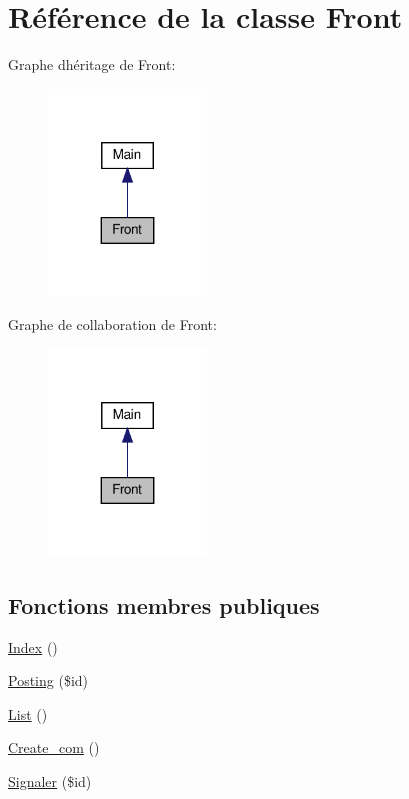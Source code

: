 \hypertarget{class_src_1_1_controllers_1_1_front}{}\section{Référence de la classe Front}
\label{class_src_1_1_controllers_1_1_front}


Graphe d\textquotesingle{}héritage de Front\+:\nopagebreak
\begin{figure}[H]
\begin{center}
\leavevmode
\includegraphics[width=119pt]{d6/db7/class_src_1_1_controllers_1_1_front__inherit__graph}
\end{center}
\end{figure}


Graphe de collaboration de Front\+:\nopagebreak
\begin{figure}[H]
\begin{center}
\leavevmode
\includegraphics[width=119pt]{d8/d00/class_src_1_1_controllers_1_1_front__coll__graph}
\end{center}
\end{figure}
\subsection*{Fonctions membres publiques}
\begin{DoxyCompactItemize}
\item 
\hyperlink{class_src_1_1_controllers_1_1_front_ac36db983080e1b0934908febca5de2d9}{Index} ()
\item 
\hyperlink{class_src_1_1_controllers_1_1_front_a5fcbe325afb03acc6e4eaec38a7bb1ae}{Posting} (\$id)
\item 
\hyperlink{class_src_1_1_controllers_1_1_front_a17e6c90f14225bdac5c65ed915b0a2f6}{List} ()
\item 
\hyperlink{class_src_1_1_controllers_1_1_front_aff5b608669ee776cd4c341238adddb7c}{Create\+\_\+com} ()
\item 
\hyperlink{class_src_1_1_controllers_1_1_front_a8b22c40bd1737bbb7db0816b7e9763b3}{Signaler} (\$id)
\end{DoxyCompactItemize}
